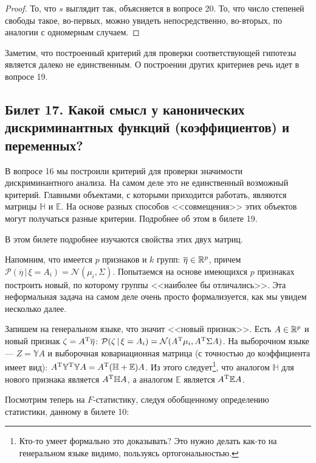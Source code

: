 \begin{proof}
   То, что $s$ выглядит так, объясняется в вопросе 20.
   То, что число степеней свободы такое, во-первых, можно увидеть непосредственно, во-вторых, по аналогии с одномерным случаем.
\end{proof}

Заметим, что построенный критерий для проверки соответствующей гипотезы является далеко не единственным.
О построении других критериев речь идет в вопросе 19.


\subsection{Билет 17. Какой смысл у канонических дискриминантных функций (коэффициентов) и переменных?}

В вопросе 16 мы построили критерий для проверки значимости дискриминантного анализа.
На самом деле это не единственный возможный критерий.
Главными объектами, с которыми приходится работать, являются матрицы $\mathbb H$ и $\mathbb E$.
На основе разных способов <<совмещения>> этих объектов могут получаться разные критерии.
Подробнее об этом в билете 19.

В этом билете подробнее изучаются свойства этих двух матриц.

\bigskip

Напомним, что имеется $p$ признаков и $k$ групп: $\overline \eta \in \mathbb{R}^p$, причем $\mathcal P(\overline \eta \, | \, \xi = A_i) =
\mathcal N(\mu_i, \Sigma)$.
Попытаемся на основе имеющихся $p$ признаках построить новый, по которому группы <<наиболее бы отличались>>.
Эта неформальная задача на самом деле очень просто формализуется, как мы увидем несколько далее.

Запишем на генеральном языке, что значит <<новый признак>>. Есть $A \in \mathbb{R}^p$ и новый признак
$\zeta = A^{\mathrm{T}} \overline \eta$: $\mathcal P(\zeta \, | \, \xi = A_i) = \mathcal N(A^{\mathrm{T}} \mu_i, A^{\mathrm{T}} \Sigma A)$.
На выборочном языке --- $Z = \mathbb Y A$ и выборочная ковариационная матрица (с точностью до коэффициента имеет вид):
$A^{\mathrm{T}} \mathbb Y^{\mathrm{T}} \mathbb Y A = A^{\mathrm{T}} ( \mathbb H + \mathbb E ) A$. Из этого следует\footnote{\color{blue} Кто-то умеет формально
это доказывать? Это нужно делать как-то на генеральном языке видимо, пользуясь ортогональностью.}, что аналогом $\mathbb H$ для
нового признака является $A^{\mathrm{T}} \mathbb H A$, а аналогом $\mathbb E$ является $A^{\mathrm{T}} \mathbb E A$.

Посмотрим теперь на $F$-статистику, следуя обобщенному определению статистики, данному в билете 10:

